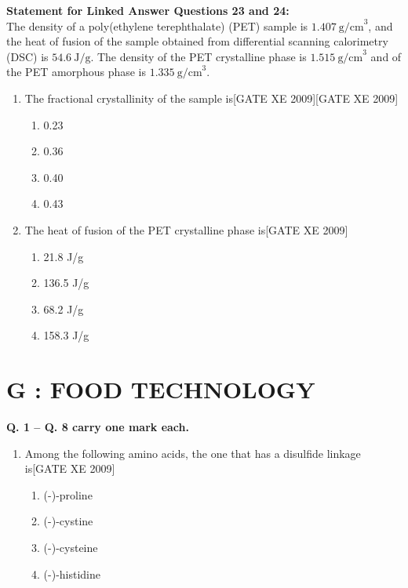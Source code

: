 \documentclass[journal,12pt,onecolumn]{IEEEtran}
\theoremstyle{remark}
\begin{document}
\begin{enumerate}
\begin{enumerate}
\begin{enumerate}[label=\textbf{Q.\arabic*.}, resume, wide=0pt, leftmargin=*]
\textbf{Statement for Linked Answer Questions 23 and 24:}\\
The density of a poly(ethylene terephthalate) (PET) sample is $1.407~\text{g/cm}^3$, and the heat of fusion of the sample obtained from differential scanning calorimetry (DSC) is $54.6~\text{J/g}$. The density of the PET crystalline phase is $1.515~\text{g/cm}^3$ and of the PET amorphous phase is $1.335~\text{g/cm}^3$.
\end{enumerate}
\begin{enumerate}[label=\textbf{Q.\arabic*.}, resume, wide=0pt, leftmargin=*]

\item The fractional crystallinity of the sample is\hfill[GATE XE 2009]\hfill[GATE XE 2009]
\begin{multicols}{2}
\begin{enumerate}
\item 0.23
\item 0.36
\item 0.40
\item 0.43
\end{enumerate}
\end{multicols}

\item The heat of fusion of the PET crystalline phase is\hfill[GATE XE 2009]
\begin{multicols}{2}
\begin{enumerate}
\item 21.8 J/g
\item 136.5 J/g
\item 68.2 J/g
\item 158.3 J/g
\end{enumerate}
\end{multicols}
\end{enumerate}


\vspace{1em}

\clearpage
\section*{G : FOOD TECHNOLOGY}

 \textbf{Q. 1 -- Q. 8 carry one mark each.}
\begin{enumerate}[label=\textbf{Q.\arabic*.}, wide=0pt, leftmargin=*]


\item Among the following amino acids, the one that has a disulfide linkage is\hfill[GATE XE 2009]
\begin{multicols}{2}
\begin{enumerate}
\item (-)-proline
\item (-)-cystine
\item (-)-cysteine
\item (-)-histidine
\end{enumerate}
\end{multicols}


\end{enumerate}
\end{enumerate}
\end{enumerate}
\end{document}
